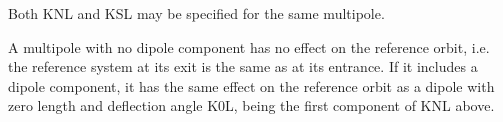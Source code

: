 Both KNL and KSL may be specified for the same multipole. 

A multipole with no dipole component has no effect on the reference
orbit, i.e. the reference system at its exit is the same as at its
entrance. If it includes a dipole component, it has the same effect on
the reference orbit as a dipole with zero length and deflection angle
K0L, being the first component of KNL above.  

